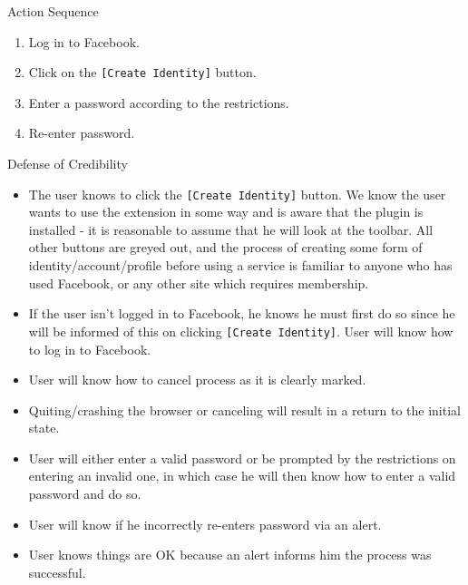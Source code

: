 \begin{desc}

    \item[Action Sequence] \hfill
    
    \begin{enumerate}
        \item Log in to Facebook.
        \item Click on the {\tt [Create Identity]} button.
        \item Enter a password according to the restrictions.
        \item Re-enter password.
    \end{enumerate}
    
    \item[Defense of Credibility] \hfill
        \begin{itemize}
            
            \item The user knows to click the {\tt [Create Identity]} button. We know the user wants to use the extension in some way and is aware that the plugin is installed - it is reasonable to assume that he will look at the toolbar. All other buttons are greyed out, and the process of creating some form of identity/account/profile before using a service is familiar to anyone who has used Facebook, or any other site which requires membership.
            
            \item If the user isn't logged in to Facebook, he knows he must first do so since he will be informed of this on clicking {\tt [Create Identity]}. User will know how to log in to Facebook.
            
            \item User will know how to cancel process as it is clearly marked.
            
            \item Quiting/crashing the browser or canceling will result in a return to the initial state.
            
            \item User will either enter a valid password or be prompted by the restrictions on entering an invalid one, in which case he will then know how to enter a valid password and do so.
            
            \item User will know if he incorrectly re-enters password via an alert.
            
            \item User knows things are OK because an alert informs him the process was successful.
            
        \end{itemize}
\end{desc}

